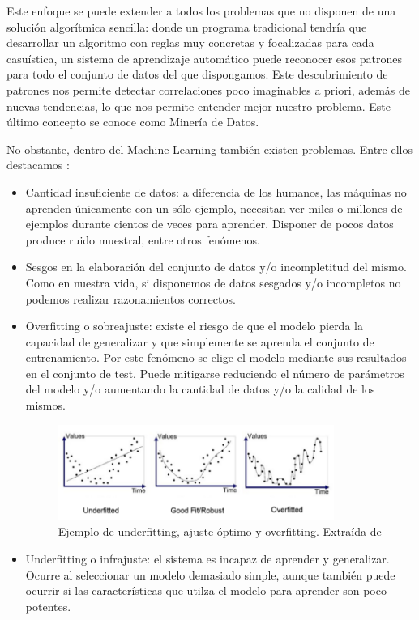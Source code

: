 \documentclass[../main.tex]{subfiles}
\begin{document}
Este enfoque se puede extender a todos los problemas que no disponen de una solución algorítmica sencilla: donde un programa tradicional tendría que desarrollar un algoritmo con reglas muy concretas y focalizadas para cada casuística, un sistema de aprendizaje automático puede reconocer esos patrones para todo el conjunto de datos del que dispongamos. Este descubrimiento de patrones nos permite detectar correlaciones poco imaginables a priori, además de nuevas tendencias, lo que nos permite entender mejor nuestro problema. Este último concepto se conoce como Minería de Datos. \newline

No obstante, dentro del Machine Learning también existen problemas. Entre ellos destacamos :
\begin{itemize}
    \item Cantidad insuficiente de datos: a diferencia de los humanos, las máquinas no aprenden únicamente con un sólo ejemplo, necesitan ver miles o millones de ejemplos durante cientos de veces para aprender. Disponer de pocos datos produce ruido muestral, entre otros fenómenos.
    \item Sesgos en la elaboración del conjunto de datos y/o incompletitud del mismo. Como en nuestra vida, si disponemos de datos sesgados y/o incompletos no podemos realizar razonamientos correctos.
    \item Overfitting o sobreajuste: existe el riesgo de que el modelo pierda la capacidad de generalizar y que simplemente se aprenda el conjunto de entrenamiento. Por este fenómeno se elige el modelo mediante sus resultados en el conjunto de test. Puede mitigarse reduciendo el número de parámetros del modelo y/o aumentando la cantidad de datos y/o la calidad de los mismos.
    
    \begin{figure}[h]
        \centering
        \includegraphics[width=0.85\textwidth]{imagenes/Under-overfitting.png}
        \caption[Ejemplo de underfitting, ajuste óptimo y overfitting.]{Ejemplo de underfitting, ajuste óptimo y overfitting. Extraída de \cite{Balaji2019}}
        \label{fig:ejemplo_underfitting_overfitting}
    \end{figure}
    
    \item Underfitting o infrajuste: el sistema es incapaz de aprender y generalizar. Ocurre al seleccionar un modelo demasiado simple, aunque también puede ocurrir si las características que utilza el modelo para aprender son poco potentes.
\end{itemize}
\end{document}
